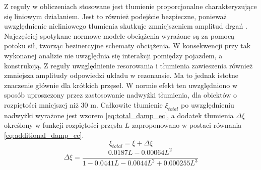 Z reguły w obliczeniach stosowane jest tłumienie proporcjonalne charakteryzujące się liniowym działaniem. Jest to również podejście bezpieczne, ponieważ uwzględnienie nieliniowego tłumienia skutkuje zmniejszeniem amplitud drgań \parencite{Ulker-Kaustell2012a,Oleszek2015}. 
Najczęściej spotykane normowe modele obciążenia wyrażone są za pomocą potoku sił, tworząc bezinercyjne schematy obciążenia. W konsekwencji przy tak wykonanej analizie nie uwzględnia się interakcji pomiędzy pojazdem, a konstrukcją. Z reguły uwzględnienie resorowania i tłumienia zawieszenia również zmniejsza amplitudy odpowiedzi układu w rezonansie. Ma to jednak istotne znaczenie głównie dla krótkich przęseł. W normie \cite{PKNj} efekt ten uwzględniono w sposób uproszczony przez zastosowanie nadwyżki tłumienia, dla obiektów o rozpiętości mniejszej niż 30 m. Całkowite tłumienie $\xi_{total}$ po uwzględnieniu nadwyżki wyrażone jest wzorem \ref{eq:total_damp_ec}, a dodatek tłumienia $\Delta \xi$ określony w funkcji rozpiętości przęsła $L$ zaproponowano w postaci równania \ref{eq:additional_damp_ec}.
\begin{equation} \label{eq:total_damp_ec}
	\xi_{total}=\xi + \Delta \xi
\end{equation}
\begin{equation} \label{eq:additional_damp_ec}
	\Delta \xi =\frac{0.0187L-0.00064L^2}{1-0.0441L-0.0044L^2+0.000255L^3}
\end{equation}








